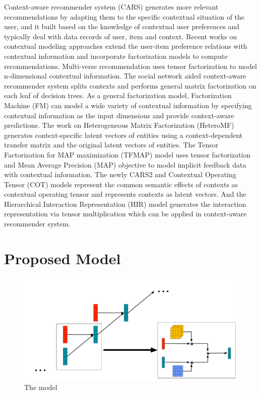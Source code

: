 \documentclass{sig-alternate}
\begin{document}
Context-aware recommender system (CARS) \cite{adomavicius2011context} generates more relevant recommendations by adapting them to the specific contextual situation of the user, and it built based on the knowledge of contextual user preferences and typically deal with data records of user, item and context. Recent works on contextual modeling approaches extend the user-item preference relations with contextual information and incorporate factorization models to compute recommendations. Multi-verse recommendation \cite{karatzoglou2010multiverse} uses tensor factorization to model n-dimensional contextual information. The social network aided context-aware recommender system \cite{liu2013soco} splits contexts and performs general matrix factorization on each leaf of decision trees. As a general factorization model, Factorization Machine (FM) \cite{rendle2011fast} can model a wide variety of contextual information by specifying contextual information as the input dimensions and provide context-aware predictions. The work on Heterogeneous Matrix Factorization (HeteroMF) \cite{jamali2013heteromf} generates context-specific latent vectors of entities using a context-dependent transfer matrix and the original latent vectors of entities. The Tensor Factorization for MAP maximization (TFMAP) model \cite{shi2012tfmap} uses tensor factorization and Mean Average Precision (MAP) objective to model implicit feedback data with contextual information. The newly CARS2 \cite{shi2014cars} and Contextual Operating Tensor (COT) \cite{liu2015cot} models represent the common semantic effects of contexts as contextual operating tensor and represents contexts as latent vectors. And the Hierarchical Interaction Representation (HIR) model \cite{liu2015collaborative} generates the interaction representation via tensor multiplication which can be applied in context-aware recommender system.
\section{Proposed Model}

\begin{figure}[htb]
\centering
\includegraphics[width=1\linewidth]{./model.pdf}
\caption{The model}
\label{fig:Model-overview}
\end{figure}
\end{document}

